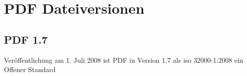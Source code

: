 \section{PDF Dateiversionen}

\subsection{PDF 1.7}
Veröffentlichung am 1. Juli 2008 ist PDF in Version 1.7 als \acrshort{iso} 32000-1:2008 ein Offener Standard